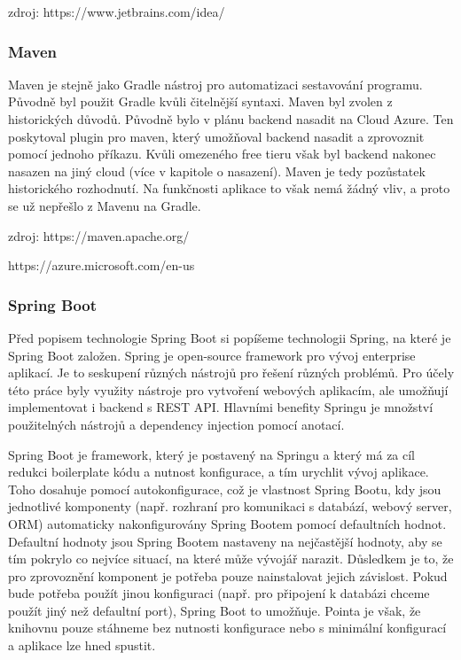 zdroj: https://www.jetbrains.com/idea/

\subsubsection*{Maven}
Maven je stejně jako Gradle nástroj pro automatizaci sestavování programu. Původně byl použit Gradle kvůli čitelnější syntaxi. Maven byl zvolen z historických důvodů. Původně bylo v plánu backend nasadit na Cloud Azure. Ten poskytoval plugin pro maven, který umožňoval backend nasadit a zprovoznit pomocí jednoho příkazu. Kvůli omezeného free tieru však byl backend nakonec nasazen na jiný cloud (více v kapitole o nasazení). Maven je tedy pozůstatek historického rozhodnutí. Na funkčnosti aplikace to však nemá žádný vliv, a proto se už nepřešlo z Mavenu na Gradle. 

zdroj: https://maven.apache.org/

https://azure.microsoft.com/en-us

\subsubsection*{Spring Boot}
Před popisem technologie Spring Boot si popíšeme technologii Spring, na které je Spring Boot založen. Spring je open-source framework pro vývoj enterprise aplikací. Je to seskupení různých nástrojů pro řešení různých problémů. Pro účely této práce byly využity nástroje pro vytvoření webových aplikacím, ale umožňují implementovat i backend s REST API. Hlavními benefity Springu je množství použitelných nástrojů a dependency injection pomocí anotací.

Spring Boot je framework, který je postavený na Springu a který má za cíl redukci boilerplate kódu a nutnost konfigurace, a tím urychlit vývoj aplikace. Toho dosahuje pomocí autokonfigurace, což je vlastnost Spring Bootu, kdy jsou jednotlivé komponenty (např. rozhraní pro komunikaci s databází, webový server, ORM) automaticky nakonfigurovány Spring Bootem pomocí defaultních hodnot. Defaultní hodnoty jsou Spring Bootem nastaveny na nejčastější hodnoty, aby se tím pokrylo co nejvíce situací, na které může vývojář narazit. Důsledkem je to, že pro zprovoznění komponent je potřeba pouze nainstalovat jejich závislost. Pokud bude potřeba použít jinou konfiguraci (např. pro připojení k databázi chceme použít jiný než defaultní port), Spring Boot to umožňuje. Pointa je však, že knihovnu pouze stáhneme bez nutnosti konfigurace nebo s minimální konfigurací a aplikace lze hned spustit.

